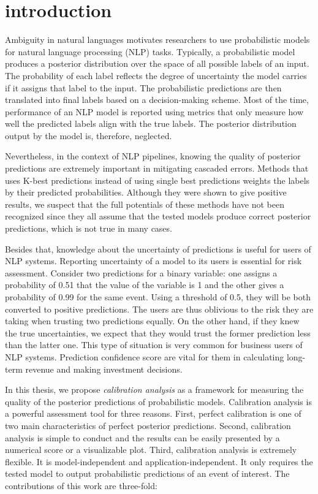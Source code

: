 \chapter{introduction}
\doublespacenormalsize
Ambiguity in natural languages motivates researchers to use probabilistic models for natural language processing (NLP) tasks. Typically, a probabilistic model produces a posterior distribution over the space of all possible labels of an input. The probability of each label reflects the degree of uncertainty the model carries if it assigns that label to the input. The probabilistic predictions are then translated into final labels based on a decision-making scheme. Most of the time, performance of an NLP model is reported using metrics that only measure how well the predicted labels align with the true labels. The posterior distribution output by the model is, therefore, neglected.  

Nevertheless, in the context of NLP pipelines, knowing the quality of posterior predictions are extremely important in mitigating cascaded errors. Methods that uses K-best predictions \citep{sutton2005joint, wellner2004integrated, finkel2006solving} instead of using single best predictions weights the labels by their predicted probabilities. Although they were shown to give positive results, we suspect that the full potentials of these methods have not been recognized since they all assume that the tested models produce correct posterior predictions, which is not true in many cases. 

Besides that, knowledge about the uncertainty of predictions is useful for users of NLP systems. Reporting uncertainty of a model to its users is essential for risk assessment. Consider two predictions for a binary variable: one assigns a probability of 0.51 that the value of the variable is 1 and the other gives a probability of 0.99 for the same event. Using a threshold of 0.5, they will be both converted to positive predictions. The users are thus oblivious to the risk they are taking when trusting two predictions equally. On the other hand, if they knew the true uncertainties, we expect that they would trust the former prediction less than the latter one. This type of situation is very common for business users of NLP systems. Prediction confidence score are vital for them in calculating long-term revenue and making investment decisions.

In this thesis, we propose \textit{calibration analysis} as a framework for measuring the quality of the posterior predictions of probabilistic models. Calibration analysis is a powerful assessment tool for three reasons. First, perfect calibration is one of two main characteristics of perfect posterior predictions. Second, calibration analysis is simple to conduct and the results can be easily presented by a numerical score or a visualizable plot. Third, calibration analysis is extremely flexible. It is model-independent and application-independent. It only requires the tested model to output probabilistic predictions of an event of interest. The contributions of this work are three-fold: 

